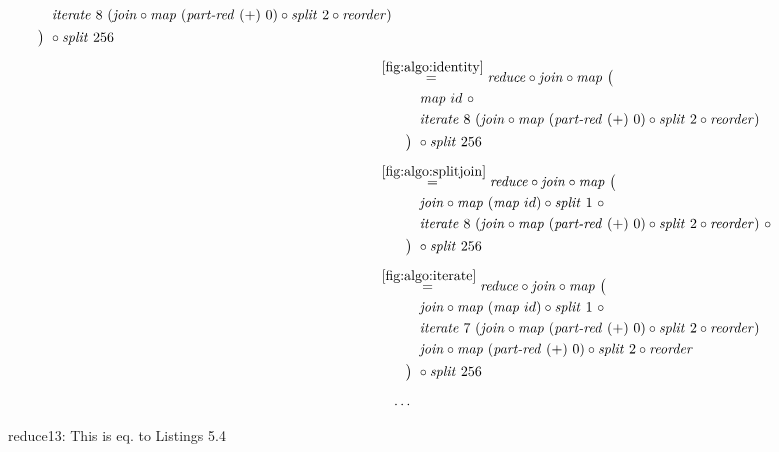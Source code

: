 \begin{figure*}[t]
\begin{align*}
\begin{aligned}
    &\qquad\quad\iterateN\ 8\ (\join \circ \map\ (\partRed\ (+)\ 0) \circ \splitN\ 2\circ \reorder)\\
    &\qquad\big)\ \circ \splitN\ 256
  \end{aligned}\\[.5em]
%
  &\hspace{-2em}\quad\begin{aligned}
    &\overset{\ref{fig:algo:identity}}{=\hspace{.2em}}
      \reduce \circ \join \circ \map\ \big(\\
    &\qquad\quad\map\ id\ \circ \\
    &\qquad\quad\iterateN\ 8\ (\join \circ \map\ (\partRed\ (+)\ 0) \circ \splitN\ 2\circ \reorder)\\
    &\qquad\big)\ \circ \splitN\ 256
  \end{aligned}\\[.5em]
%
  &\hspace{-2em}\quad\begin{aligned}
    &\overset{\ref{fig:algo:splitjoin}}{=\hspace{.2em}}
      \reduce \circ \join \circ \map\ \big(\\
    &\qquad\quad\join \circ \map\ (\map\ id) \circ \splitN\ 1\ \circ\\
    &\qquad\quad\iterateN\ 8\ (\join \circ \map\ (\partRed\ (+)\ 0) \circ \splitN\ 2\circ \reorder)\ \circ\\
    &\qquad\big)\ \circ \splitN\ 256
  \end{aligned}\\[.5em]
%
  &\hspace{-2em}\quad\begin{aligned}
    &\overset{\ref{fig:algo:iterate}}{=\hspace{.2em}}
      \reduce \circ \join \circ \map\ \big(\\
    &\qquad\quad\join \circ \map\ (\map\ id) \circ \splitN\ 1\ \circ\\
    &\qquad\quad\iterateN\ 7\ (\join \circ \map\ (\partRed\ (+)\ 0) \circ \splitN\ 2\circ \reorder)\\
    &\qquad\quad\join \circ \map\ (\partRed\ (+)\ 0) \circ \splitN\ 2\circ \reorder\\
    &\qquad\big)\ \circ \splitN\ 256
  \end{aligned}\\[.5em]
%
  &\ldots
\end{align*}
\caption{reduce13: This is eq. to Listings 5.4}
\end{figure*}

